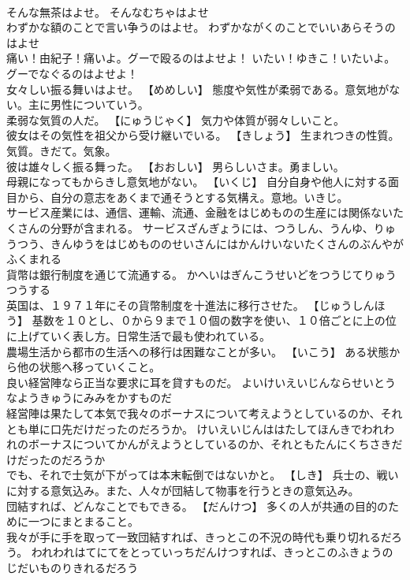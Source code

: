 \documentclass[8pt]{extreport}
\begin{document}
\begin{CJK}{UTF8}{min}
\\	そんな無茶はよせ。	そんなむちゃはよせ 
\\	わずかな額のことで言い争うのはよせ。	わずかながくのことでいいあらそうのはよせ 
\\	痛い！由紀子！痛いよ。グーで殴るのはよせよ！	いたい！ゆきこ！いたいよ。グーでなぐるのはよせよ！ 
\\	女々しい振る舞いはよせ。	【めめしい】 態度や気性が柔弱である。意気地がない。主に男性についていう。
\\	柔弱な気質の人だ。	【にゅうじゃく】 気力や体質が弱々しいこと。
\\	彼女はその気性を祖父から受け継いでいる。	【きしょう】 生まれつきの性質。気質。きだて。気象。
\\	彼は雄々しく振る舞った。	【おおしい】 男らしいさま。勇ましい。
\\	母親になってもからきし意気地がない。	【いくじ】 自分自身や他人に対する面目から、自分の意志をあくまで通そうとする気構え。意地。いきじ。
\\	サービス産業には、通信、運輸、流通、金融をはじめものの生産には関係ないたくさんの分野が含まれる。	サービスざんぎょうには、つうしん、うんゆ、りゅうつう、きんゆうをはじめもののせいさんにはかんけいないたくさんのぶんやがふくまれる 
\\	貨幣は銀行制度を通じて流通する。	かへいはぎんこうせいどをつうじてりゅうつうする 
\\	英国は、１９７１年にその貨幣制度を十進法に移行させた。	【じゅうしんほう】 基数を１０とし、０から９まで１０個の数字を使い、１０倍ごとに上の位に上げていく表し方。日常生活で最も使われている。
\\	農場生活から都市の生活への移行は困難なことが多い。	【いこう】 ある状態から他の状態へ移っていくこと。
\\	良い経営陣なら正当な要求に耳を貸すものだ。	よいけいえいじんならせいとうなようきゅうにみみをかすものだ 
\\	経営陣は果たして本気で我々のボーナスについて考えようとしているのか、それとも単に口先だけだったのだろうか。	けいえいじんははたしてほんきでわれわれのボーナスについてかんがえようとしているのか、それともたんにくちさきだけだったのだろうか 
\\	でも、それで士気が下がっては本末転倒ではないかと。	【しき】 兵士の、戦いに対する意気込み。また、人々が団結して物事を行うときの意気込み。
\\	団結すれば、どんなことでもできる。	【だんけつ】 多くの人が共通の目的のために一つにまとまること。
\\	我々が手に手を取って一致団結すれば、きっとこの不況の時代も乗り切れるだろう。	われわれはてにてをとっていっちだんけつすれば、きっとこのふきょうのじだいものりきれるだろう 

\end{CJK}
\end{document}
